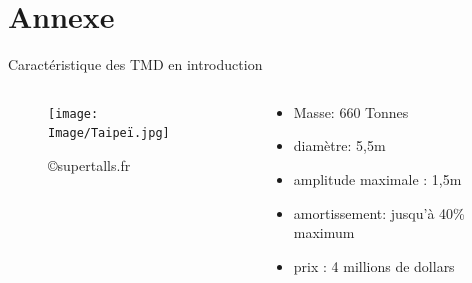 \documentclass{beamer}
\begin{document}
	
	
	
	
	
	
	
	

	\appendix
	\section*{Annexe}
	\begin{frame}{Caractéristique des TMD en introduction}
		\begin{columns}
			
		
		\begin{column}{0.5\textwidth}
			
		
		\begin{figure}
			\texttt{[image: Image/Taipeï.jpg]}
			\caption{\copyright supertalls.fr} 
		\end{figure}
	\end{column}
	\begin{column}{0.5\textwidth}
		\begin{itemize}
			\item Masse: 660 Tonnes
			\item diamètre: 5,5m
			\item amplitude maximale : 1,5m 
			\item amortissement: jusqu'à 40\% maximum
			\item prix : 4 millions de dollars
		\end{itemize}
	\end{column}

\end{columns}
	\end{frame}
\end{document}

